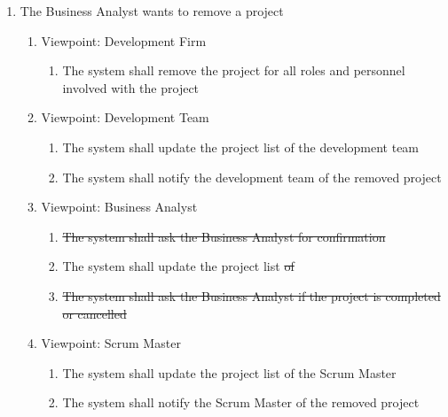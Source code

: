 \documentclass[12pt, titlepage]{article}
\begin{document}
\begin{enumerate}[{BE}1.]
    \item The Business Analyst wants to remove a project
    \begin{enumerate}[{VP}1.] 
        \item Viewpoint: Development Firm
            \begin{enumerate}
                \item The system shall remove the project for all roles and personnel involved with the project
            \end{enumerate}
        \item Viewpoint: Development Team
            \begin{enumerate}
                \item The system shall update the project list of the development team
                \item The system shall notify the development team of the removed project
            \end{enumerate}
        \item Viewpoint: Business Analyst
            \begin{enumerate}
                \item \sout{The system shall ask the Business Analyst for confirmation}
                \item The system shall update the project list \sout{of}
                \item \sout{The system shall ask the Business Analyst if the project is completed or cancelled}
            \end{enumerate}
        \item Viewpoint: Scrum Master
            \begin{enumerate}
                \item The system shall update the project list of the Scrum Master
                \item The system shall notify the Scrum Master of the removed project
            \end{enumerate}
    \end{enumerate}
    

\end{enumerate}
\end{document}
